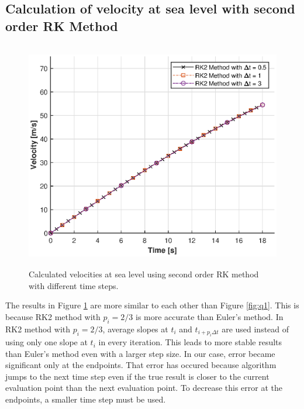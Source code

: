 \documentclass[letterpaper,12pt]{article}
\begin{document}
\subsection{Calculation of velocity at sea level with second order RK Method }
\begin{figure}[ht]
        \centering \includegraphics[max height=10cm]{graphs/RK2.eps}
        \caption{Calculated velocities at sea level using second order RK method with different time steps.}
        \label{fig:rk2}
\end{figure}
The results in Figure \ref{fig:rk2} are more similar to each other than Figure \ref{fig:q1}. This is because RK2 method with $p_i=2/3$
is more accurate than Euler's method. In RK2 method with $p_i=2/3$, average slopes at $t_i$ and $t_{i+p_i\Delta t}$
are used instead of using only one slope at $ t_i $ in every iteration. This leads to more stable results than Euler's method 
even with a larger step size. In our case, error became significant only at the endpoints. That error has occured because
algorithm jumps to the next time step even if the true result is closer to the current evaluation point than the next evaluation point.
To decrease this error at the endpoints, a smaller time step must be used.
\newpage
\end{document}
